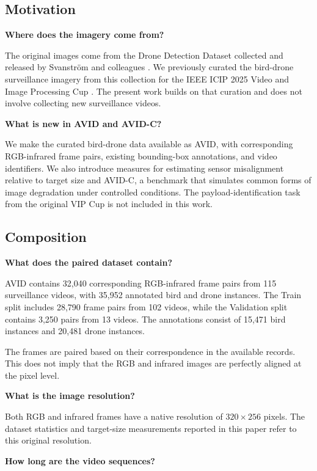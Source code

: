 \documentclass[10pt]{article}
\newcommand{\dataset}{\textsc{AVID}}
\newcommand{\corrupt}{\textsc{AVID-C}}
\begin{document}
\subsection{Motivation}

\textbf{Where does the imagery come from?}

The original images come from the Drone Detection Dataset collected and released by Svanstr\"om and colleagues \citep{svanstrom2021multisensor}. We previously curated the bird-drone surveillance imagery from this collection for the IEEE ICIP 2025 Video and Image Processing Cup \citep{ieeevipcup2025}. The present work builds on that curation and does not involve collecting new surveillance videos.

\textbf{What is new in \dataset{} and \corrupt{}?}

We make the curated bird-drone data available as \dataset{}, with corresponding RGB-infrared frame pairs, existing bounding-box annotations, and video identifiers. We also introduce measures for estimating sensor misalignment relative to target size and \corrupt{}, a benchmark that simulates common forms of image degradation under controlled conditions. The payload-identification task from the original VIP Cup is not included in this work.

\subsection{Composition}

\textbf{What does the paired dataset contain?}

\dataset{} contains 32,040 corresponding RGB-infrared frame pairs from 115 surveillance videos, with 35,952 annotated bird and drone instances. The Train split includes 28,790 frame pairs from 102 videos, while the Validation split contains 3,250 pairs from 13 videos. The annotations consist of 15,471 bird instances and 20,481 drone instances.

The frames are paired based on their correspondence in the available records. This does not imply that the RGB and infrared images are perfectly aligned at the pixel level.

\textbf{What is the image resolution?}

Both RGB and infrared frames have a native resolution of $320\times256$ pixels. The dataset statistics and target-size measurements reported in this paper refer to this original resolution.

\textbf{How long are the video sequences?}
\end{document}
